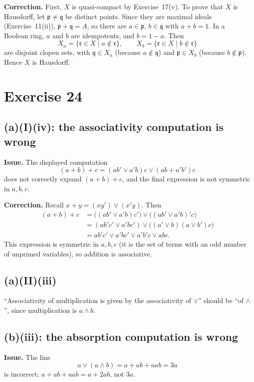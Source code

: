 \documentclass[11pt]{article}
\newcommand{\fp}{\mathfrak p}
\newcommand{\fq}{\mathfrak q}
\newcommand{\fr}{\mathfrak r}
\begin{document}
\textbf{Correction.}  First, \(X\) is quasi-compact by Exercise~17(v).  To
prove that \(X\) is Hausdorff, let \(\fp\neq\fq\) be distinct points.  Since
they are maximal ideals (Exercise~11(ii)), \(\fp+\fq=A\), so there are
\(a\in\fp\), \(b\in\fq\) with \(a+b=1\).  In a Boolean ring, \(a\) and \(b\)
are idempotents, and \(b=1-a\).  Then
\[
X_a=\{ \fr\in X\mid a\notin\fr\},\qquad
X_b=\{ \fr\in X\mid b\notin\fr\}
\]
are disjoint clopen sets, with \(\fq\in X_a\) (because \(a\notin\fq\)) and
\(\fp\in X_b\) (because \(b\notin\fp\)).  Hence \(X\) is Hausdorff.

\section*{Exercise 24}

\subsection*{(a)(I)(iv): the associativity computation is wrong}

\textbf{Issue.}  The displayed computation
\[
(a+b)+c=(ab'\vee a'b)c\vee(ab+a'b')c
\]
does not correctly expand \((a+b)+c\), and the final expression is not
symmetric in \(a,b,c\).

\textbf{Correction.}  Recall \(x+y=(xy')\vee(x'y)\).  Then
\[
\begin{aligned}
(a+b)+c
&=\bigl((ab'\vee a'b)c'\bigr)\vee\bigl((ab'\vee a'b)'c\bigr)\\
&=(ab'c'\vee a'bc')\vee\bigl((a'\vee b)(a\vee b')c\bigr)\\
&=ab'c'\vee a'bc'\vee a'b'c\vee abc.
\end{aligned}
\]
This expression is symmetric in \(a,b,c\) (it is the set of terms with an
odd number of unprimed variables), so addition is associative.

\subsection*{(a)(II)(iii)}
``Associativity of multiplication is given by the associativity of
\(\vee\)'' should be ``of \(\wedge\)'', since multiplication is \(a\wedge b\).

\subsection*{(b)(iii): the absorption computation is wrong}

\textbf{Issue.}  The line
\[
a\vee(a\wedge b)=a+ab+aab=3a
\]
is incorrect; \(a+ab+aab=a+2ab\), not \(3a\).
\end{document}
